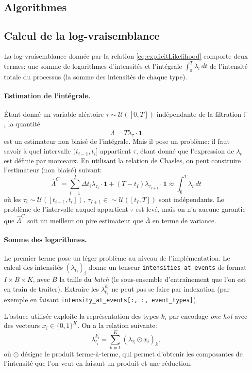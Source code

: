 \documentclass[11pt]{article}
\begin{document}
\printbibliography

\begin{appendices}
\section{Algorithmes}\label{sec:algoAppendix}

\subsection{Calcul de la log-vraisemblance}

La log-vraisemblance donnée par la relation \eqref{eq:explicitLikelihood} comporte deux termes: une somme de logarithmes d'intensités et l'intégrale $\int_0^T\lambda_t\,dt$ de l'intensité totale du processus (la somme des intensités de chaque type).

\paragraph{Estimation de l'intégrale.} Étant donné un variable aléatoire $\tau\sim\mathcal{U}([0,T])$ indépendante de la filtration $\mathds{F}$, la quantité 
\[
\bar{\Lambda} = T\lambda_\tau\cdot\mathbf 1
\]
est un estimateur non biaisé de l'intégrale. Mais il pose un problème: il faut savoir à quel intervalle $(t_{i-1}, t_i]$ appartient $\tau$, étant donné que l'expression de $\lambda_t$ est définie par morceaux. En utilisant la relation de Chasles, on peut construire l'estimateur (non biaisé) suivant:
\begin{equation}
\hat{\Lambda}^C = \sum_{i=1}^{I} \Delta t_i\lambda_{\tau_i} \cdot \mathbf{1} + (T-t_{I})\lambda_{\tau_{I+1}}\cdot\mathbf{1}
\approx
\int_0^T \lambda_t\,dt
\end{equation}
où les $\tau_i\sim\mathcal{U}([t_{i-1}, t_i])$, $\tau_{I+1}\in\sim\mathcal{U}([t_I, T])$ sont indépendants. Le problème de l'intervalle auquel appartient $\tau$ est levé, mais on n'a aucune garantie que $\hat{\Lambda}^C$ soit un meilleur ou pire estimateur que $\bar{\Lambda}$ en terme de variance.

\paragraph{Somme des logarithmes.} Le premier terme pose un léger problème au niveau de l'implémentation. Le calcul des intensités ${(\lambda_{t_i})}_i$ donne un tenseur \verb|intensities_at_events| de format $I\times B\times K$, avec $B$ la taille du \textit{batch} (le sous-ensemble d'entraînement que l'on est en train de traiter). Extraire les $\lambda^{k_i}_{t_i}$ ne peut pas se faire par indexation (par exemple en faisant \verb|intensity_at_events[:, :, event_types]|).

L'astuce utilisée exploite la représentation des types $k_i$ par encodage \textit{one-hot} avec des vecteurs $x_i\in{\{0,1\}}^K$. On a la relation suivante:
\[
	\lambda^{k_i}_{t_i} = \sum_{k=1}^K {(\lambda_{\tau_i} \odot x_i)}_k,
\]
où $\odot$ désigne le produit terme-à-terme, qui permet d'obtenir les composantes de l'intensité que l'on veut en faisant un produit et une réduction.

\end{appendices}
\end{document}
